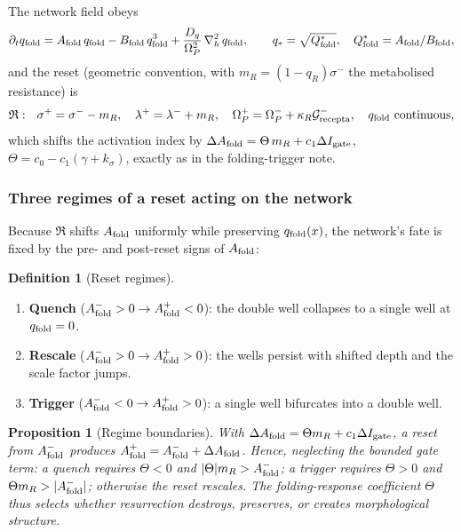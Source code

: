 \documentclass[11pt,a4paper]{article}
\newcommand{\Op}{\Omega_P}
\newcommand{\laph}{\nabla_h^2}
\newcommand{\qf}{q_{\rm fold}}
\newcommand{\Qf}{Q_{\rm fold}}
\newcommand{\Af}{A_{\rm fold}}
\newcommand{\Bf}{B_{\rm fold}}
\newcommand{\Dq}{D_q}
\newcommand{\Igate}{I_{\rm gate}}
\newcommand{\Grec}{\mathcal{G}_{\rm recepta}}
\newcommand{\reset}{\mathfrak R}
\theoremstyle{plain}
\newtheorem{proposition}{Proposition}[section]
\theoremstyle{definition}
\newtheorem{definition}{Definition}[section]
\theoremstyle{remark}
\begin{document}
The network field obeys
\begin{equation}
\partial_t\qf=\Af\,\qf-\Bf\,\qf^{3}+\frac{\Dq}{\Op^{2}}\,\laph\,\qf,
\qquad
q_\ast=\sqrt{\Qf^{*}},\quad \Qf^{*}=\Af/\Bf,
\end{equation}
and the reset (geometric convention, with $m_R=(1-q_R)\sigma^-$ the metabolised resistance) is
\begin{equation}
\reset:\ \ \sigma^+=\sigma^--m_R,\quad \lambda^+=\lambda^-+m_R,\quad
\Op^+=\Op^-+\kappa_R\Grec^-,\quad \qf\ \text{continuous},
\end{equation}
which shifts the activation index by $\Delta\Af=\Theta\,m_R+c_1\Delta\Igate$,
$\Theta=c_0-c_1(\gamma+k_\sigma)$, exactly as in the folding-trigger note.

\subsubsection{Three regimes of a reset acting on the network}

Because $\reset$ shifts $\Af$ uniformly while preserving $\qf(x)$, the network's fate is fixed by the
pre- and post-reset signs of $\Af$:

\begin{definition}[Reset regimes]
\leavevmode
\begin{enumerate}[label=(\Roman*),leftmargin=2.2em,itemsep=2pt]
\item \textbf{Quench} ($\Af^->0\to\Af^+<0$): the double well collapses to a single well at $\qf=0$.
\item \textbf{Rescale} ($\Af^->0\to\Af^+>0$): the wells persist with shifted depth and the scale factor
jumps.
\item \textbf{Trigger} ($\Af^-<0\to\Af^+>0$): a single well bifurcates into a double well.
\end{enumerate}
\end{definition}

\begin{proposition}[Regime boundaries]
With $\Delta\Af=\Theta m_R+c_1\Delta\Igate$, a reset from $\Af^-$ produces $\Af^+=\Af^-+\Delta\Af$. Hence,
neglecting the bounded gate term: a quench requires $\Theta<0$ and $|\Theta|m_R>\Af^-$; a trigger
requires $\Theta>0$ and $\Theta m_R>|\Af^-|$; otherwise the reset rescales. The folding-response
coefficient $\Theta$ thus selects whether resurrection destroys, preserves, or creates morphological
structure.
\end{proposition}
\end{document}
